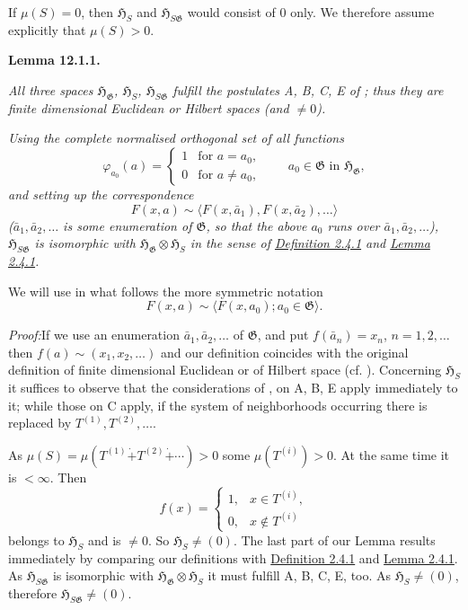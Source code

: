 \documentclass[12pt,b5paper,twoside]{article}
\newcommand{\Hspace}{\mathfrak H}
\newcommand{\Lemma}[1]{%
  \par\smallskip\noindent\phantomsection\label{lem:#1}\textbf{Lemma #1.}\enspace
}
\newcommand{\Proof}{\par\noindent\textit{Proof:}\enspace}
\newcommand{\defref}[1]{\hyperref[def:#1]{Definition #1}}
\newcommand{\lemref}[1]{\hyperref[lem:#1]{Lemma #1}}
\begin{document}
If $\mu(S)=0$, then $\Hspace_S$ and $\Hspace_{S\mathfrak G}$ would consist
of $0$ only. We therefore assume explicitly that $\mu(S)>0$.

\Lemma{12.1.1}
\emph{All three spaces $\Hspace_{\mathfrak G}$, $\Hspace_S$,
$\Hspace_{S\mathfrak G}$ fulfill the postulates A, B, C, E of
\cite[pp.~64--66]{ref16}; thus they are finite dimensional Euclidean or
Hilbert spaces (and $\neq0$).}

\emph{Using the complete normalised orthogonal set of all functions}
\[
 \varphi_{a_0}(a)=
 \begin{cases}
  1&\text{for }a=a_0,\\
  0&\text{for }a\neq a_0,
 \end{cases}
 \qquad a_0\in\mathfrak G\text{ in }\Hspace_{\mathfrak G},
\]
\emph{and setting up the correspondence}
\[
 F(x,a)\sim\langle F(x,\bar a_1),F(x,\bar a_2),\ldots\rangle
\]
\emph{($\bar a_1,\bar a_2,\ldots$ is some enumeration of $\mathfrak G$, so
that the above $a_0$ runs over $\bar a_1,\bar a_2,\ldots$),
$\Hspace_{S\mathfrak G}$ is isomorphic with
$\Hspace_{\mathfrak G}\otimes\Hspace_S$ in the sense of
\defref{2.4.1} and \lemref{2.4.1}.}

We will use in what follows the more symmetric notation
\[
 F(x,a)\sim\langle F(x,a_0);a_0\in\mathfrak G\rangle.
\]

\Proof If we use an enumeration $\bar a_1,\bar a_2,\ldots$ of $\mathfrak G$,
and put $f(\bar a_n)=x_n$, $n=1,2,\ldots$ then
$f(a)\sim(x_1,x_2,\ldots)$ and our definition coincides with the original
definition of finite dimensional Euclidean or of Hilbert space
(cf. \cite[p.~69]{ref16}). Concerning $\Hspace_S$ it suffices to observe that
the considerations of \cite[pp.~108--111]{ref16}, on A, B, E apply immediately
to it; while those on C apply, if the system of neighborhoods occurring there
is replaced by $T^{(1)},T^{(2)},\ldots$.

As
$\mu(S)=\mu(T^{(1)}\mathbin{\dot+}T^{(2)}\mathbin{\dot+}\cdots)>0$ some
$\mu(T^{(i)})>0$. At the same time it is $<\infty$. Then
\[
 f(x)=\begin{cases}
  1,&x\in T^{(i)},\\
  0,&x\notin T^{(i)}
 \end{cases}
\]
belongs to $\Hspace_S$ and is $\neq0$. So $\Hspace_S\neq(0)$. The last part
of our Lemma results immediately by comparing our definitions with
\defref{2.4.1} and \lemref{2.4.1}. As $\Hspace_{S\mathfrak G}$ is isomorphic
with $\Hspace_{\mathfrak G}\otimes\Hspace_S$ it must fulfill A, B, C, E, too.
As $\Hspace_S\neq(0)$, therefore $\Hspace_{S\mathfrak G}\neq(0)$.
\end{document}

